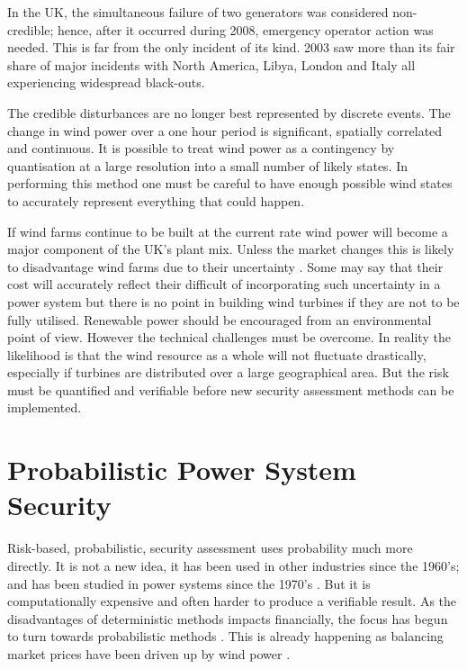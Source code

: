 \documentclass[a4paper,oneside,12pt]{report}
\begin{document}
In the UK, the simultaneous failure of two generators was considered non-credible; hence, after it occurred during 2008, emergency operator action was needed. This is far from the only incident of its kind. 2003 saw more than its fair share of major incidents with North America, Libya, London and Italy \cite{El-werfelli2008} all experiencing widespread black-outs.

The credible disturbances are no longer best represented by discrete events. The change in wind power over a one hour period is significant, spatially correlated and continuous. It is possible to treat wind power as a contingency by quantisation at a large resolution into a small number of likely states. In performing this method one must be careful to have enough possible wind states to accurately represent everything that could happen.

If wind farms continue to be built at the current rate wind power will become a major component of the UK's plant mix. Unless the market changes this is likely to disadvantage wind farms due to their uncertainty \cite{BWEA2005}. Some may say that their cost will accurately reflect their difficult of incorporating such uncertainty in a power system but there is no point in building wind turbines if they are not to be fully utilised.  Renewable power should be encouraged from an environmental point of view. However the technical challenges must be overcome. In reality the likelihood is that the wind resource as a whole will not fluctuate drastically, especially if turbines are distributed over a large geographical area. But the risk must be quantified and verifiable before new security assessment methods can be implemented.

\section{Probabilistic Power System Security}

Risk-based, probabilistic, security assessment uses probability much more directly. It is not a new idea, it has been used in other industries since the 1960's; and has been studied in power systems since the 1970's \cite{Patton1972}. But it is computationally expensive and often harder to produce a verifiable result. As the disadvantages of deterministic methods impacts financially, the focus has begun to turn towards probabilistic methods \cite{McCalley1999, Kirschen2002}. This is already happening as balancing market prices have been driven up by wind power \cite{BWEA2005}.
\end{document}

